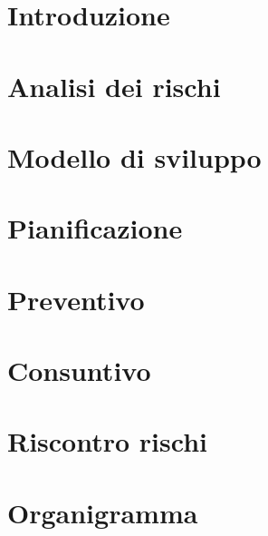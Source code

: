 \documentclass[]{article}
\begin{document}
	
	\newpage
	\tableofcontents
	\newpage
	\listoffigures
	\listoftables
	\newpage


	\section{Introduzione}
	
	\newpage

	\section{Analisi dei rischi}
	
	\newpage

	\section{Modello di sviluppo}
	
	\newpage

	\section{Pianificazione}
	
	\newpage

	\section{Preventivo}
	
	\newpage

	\section{Consuntivo}
	
	\newpage

	\appendix
	\section{Riscontro rischi}
	
	\newpage

	\section{Organigramma}
	
	\newpage
\end{document}
